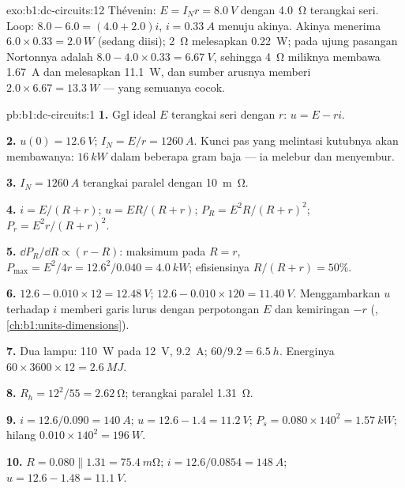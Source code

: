 \begin{solution}{exo:b1:dc-circuits:12}
Thévenin: $E = I_N r = \qty{8.0}{V}$ dengan \qty{4.0}{\ohm} terangkai seri.
Loop: $8.0 - 6.0 = (4.0 + 2.0)i$, $i = \qty{0.33}{A}$ menuju akinya.
Akinya menerima $6.0 \times 0.33 = \qty{2.0}{W}$ (sedang diisi); 
\qty{2}{\ohm} melesapkan \qty{0.22}{W};  pada ujung pasangan
Nortonnya adalah $8.0 - 4.0 \times 0.33 = \qty{6.67}{V}$, sehingga
\qty{4}{\ohm} miliknya membawa \qty{1.67}{A} dan melesapkan
\qty{11.1}{W}, dan sumber arusnya memberi $2.0 \times 6.67 = \qty{13.3}{W}$
--- yang semuanya cocok.
\end{solution}

\begin{solution}{pb:b1:dc-circuits:1}
\textbf{1.} Ggl ideal $E$ terangkai seri dengan $r$: $u = E - ri$.

\textbf{2.} $u(0) = \qty{12.6}{V}$; $I_N = E/r = \qty{1260}{A}$. Kunci pas
yang melintasi kutubnya akan membawanya: $\qty{16}{kW}$ dalam beberapa
gram baja --- ia melebur dan menyembur.

\textbf{3.}  $I_N = \qty{1260}{A}$ terangkai paralel dengan
\qty{10}{m\ohm}.

\textbf{4.} $i = E/(R + r)$; $u = ER/(R + r)$; $P_R = E^2R/(R + r)^2$;
$P_r = E^2r/(R + r)^2$.

\textbf{5.} $\dd P_R/\dd R \propto (r - R)$: maksimum pada $R = r$,
$P_{\max} = E^2/4r = 12.6^2/0.040 = \qty{4.0}{kW}$; efisiensinya
$R/(R + r) = 50\%$.

\textbf{6.} $12.6 - 0.010 \times 12 = \qty{12.48}{V}$; $12.6 - 0.010 \times
120 = \qty{11.40}{V}$. Menggambarkan $u$ terhadap $i$ memberi garis lurus
dengan perpotongan $E$ dan kemiringan $-r$ (, \cref{ch:b1:units-dimensions}).

\textbf{7.} Dua lampu: \qty{110}{W} pada \qty{12}{V}, \qty{9.2}{A};
$60/9.2 = \qty{6.5}{h}$. Energinya $60 \times 3600 \times 12 = \qty{2.6}{MJ}$.

\textbf{8.} $R_h = 12^2/55 = \qty{2.62}{\ohm}$; terangkai paralel \qty{1.31}{\ohm}.

\textbf{9.} $i = 12.6/0.090 = \qty{140}{A}$; $u = 12.6 - 1.4 = \qty{11.2}{V}$;
$P_s = 0.080 \times 140^2 = \qty{1.57}{kW}$; hilang $0.010 \times 140^2 =
\qty{196}{W}$.

\textbf{10.} $R = 0.080 \parallel 1.31 = \qty{75.4}{m\ohm}$; $i = 12.6/0.0854
= \qty{148}{A}$; $u = 12.6 - 1.48 = \qty{11.1}{V}$.


\end{solution}
